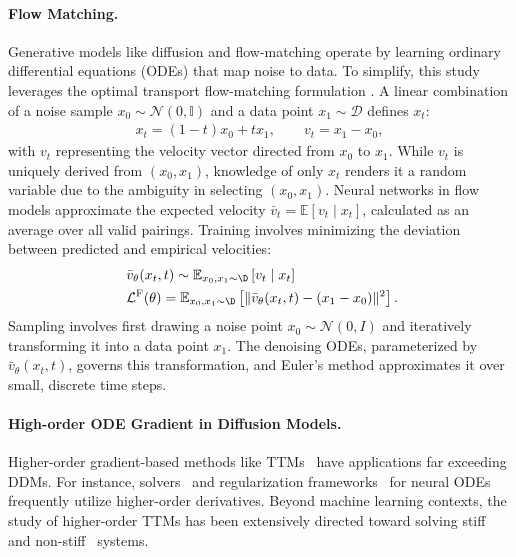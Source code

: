 \paragraph{Flow Matching. }
Generative models like diffusion \citep{swmg15, hja20, sme20} and flow-matching \citep{lcb+22, lgl22} operate by learning ordinary differential equations (ODEs) that map noise to data. To simplify, this study leverages the optimal transport flow-matching formulation \citep{lgl22}. A linear combination of a noise sample $x_0 \sim \mathcal{N}(0, \mathbb{I})$ and a data point $x_1 \sim \mathcal{D}$ defines $x_t$:
\begin{align*}
x_t = (1-t)x_0 + tx_1,
\qquad v_t = x_1 - x_0,
\end{align*}
with $v_t$ representing the velocity vector directed from $x_0$ to $x_1$. While $v_t$ is uniquely derived from $(x_0, x_1)$, knowledge of only $x_t$ renders it a random variable due to the ambiguity in selecting $(x_0, x_1)$. Neural networks in flow models approximate the expected velocity $\bar{v}_t = \mathbb{E}[v_t \mid x_t]$, calculated as an average over all valid pairings. Training involves minimizing the deviation between predicted and empirical velocities:
\begin{align}\label{eq:flow-matching}
& ~ \notag \bar{v}_\theta(x_t, t) \sim \mathbb{E}_{x_0,x_1 \sim \D} \left[ v_t \mid x_t \right] \\ 
& ~ \mathcal{L}^{\mathrm{F}}(\theta) = \mathbb{E}_{x_0,x_1 \sim \D} \left[ \| \bar{v}_\theta(x_t, t) - (x_1-x_0) \|^2 \right].
\end{align}
Sampling involves first drawing a noise point $x_0 \sim \mathcal{N}(0, I)$ and iteratively transforming it into a data point $x_1$. The denoising ODEs, parameterized by $\bar{v}_\theta(x_t, t)$, governs this transformation, and Euler’s method approximates it over small, discrete time steps.

\paragraph{High-order ODE Gradient in Diffusion Models. }

Higher-order gradient-based methods like TTMs~\cite{kp92} have applications far exceeding DDMs. For instance, solvers~\cite{dng+22} and regularization frameworks~\cite{kbjd20,fjno20} for neural ODEs~\cite{crbd18,gcb+18} frequently utilize higher-order derivatives. Beyond machine learning contexts, the study of higher-order TTMs has been extensively directed toward solving stiff~\cite{cc94} and non-stiff~\cite{cc94,cc82} systems.
